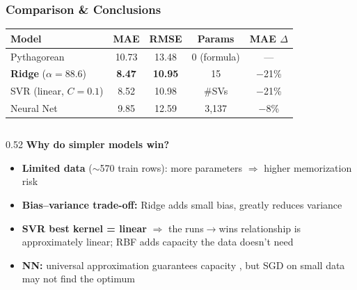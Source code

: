 \documentclass{beamer}
\begin{document}
\begin{frame}[t]
\frametitle{Comparison \& Conclusions}

\vspace{-4pt}

\begin{center}
{\small
\begin{tabular}{@{}l c c c c@{}}
\hline
\textbf{Model} & \textbf{MAE} & \textbf{RMSE} & \textbf{Params} & \textbf{MAE $\Delta$} \\
\hline
Pythagorean       & 10.73 & 13.48 & 0 (formula)       & ---             \\
\textbf{Ridge} ($\alpha\!=\!88.6$)  & \textbf{\color{teal}8.47}  & \textbf{\color{teal}10.95} & 15  & $-$21\%  \\
SVR (linear, $C\!=\!0.1$)  & {\color{teal}8.52}  & {\color{teal}10.98} & \#SVs  & $-$21\%  \\
Neural Net        & 9.85  & 12.59 & 3{,}137  & $-$8\%   \\
\hline
\end{tabular}}
\end{center}

\vspace{2pt}
\begin{columns}[T]

\begin{column}{0.52\textwidth}
{\scriptsize\textbf{Why do simpler models win?}}

\vspace{2pt}
{\scriptsize
\begin{itemize}
  \setlength{\itemsep}{2pt}
  \item \textbf{Limited data} (${\sim}$570 train rows):
    more parameters $\Rightarrow$ higher memorization risk
    {\tiny\color{gray}}
  \item \textbf{Bias--variance trade-off:}
    Ridge adds small bias, greatly reduces variance
    {\tiny\color{gray}}
  \item \textbf{SVR best kernel = linear} $\Rightarrow$ the
    runs$\to$wins relationship is approximately linear;
    RBF adds capacity the data doesn't need
    {\tiny\color{gray}}
  \item \textbf{NN:} universal approximation guarantees capacity
    {\tiny\color{gray}}, but SGD on small data
    may not find the optimum
    {\tiny\color{gray}}
\end{itemize}
}
\end{column}


\end{columns}
\end{frame}
\end{document}

